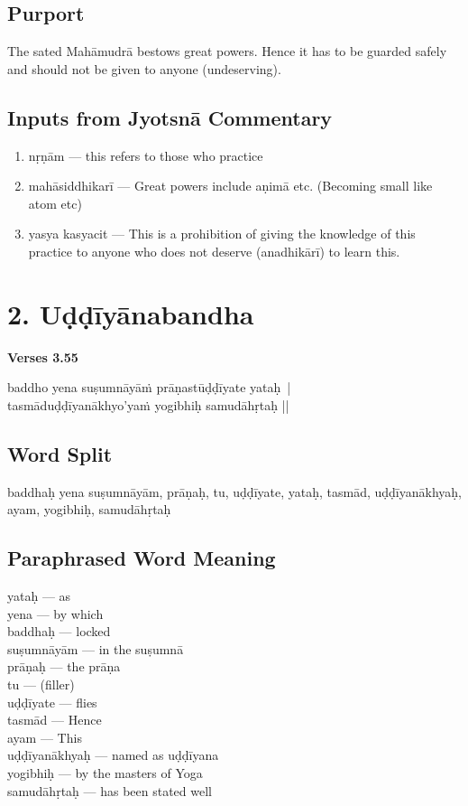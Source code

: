 \subsection*{Purport}

The sated Mahāmudrā bestows great powers. Hence it has to be guarded safely and should not be given to anyone (undeserving).

\subsection*{Inputs from Jyotsnā Commentary}

\begin{enumerate}
\item nṛṇām --- this refers to those who practice 
\item mahāsiddhikarī --- Great powers include aṇimā etc. (Becoming small like atom etc)
\item yasya kasyacit --- This is a prohibition of giving the knowledge of this practice to anyone who does not deserve  (anadhikārī) to learn this. 
\end{enumerate}
\newpage

\section*{2. Uḍḍīyānabandha}

\noindent \textbf{Verses 3.55}

\begin{shloka}
baddho yena suṣumnāyāṁ prāṇastūḍḍīyate yataḥ |\\
tasmāduḍḍīyanākhyo'yaṁ yogibhiḥ samudāhṛtaḥ ||
\end{shloka}

\subsection*{Word Split}

baddhaḥ yena suṣumnāyām,  prāṇaḥ, tu, uḍḍīyate, yataḥ, tasmād, uḍḍīyanākhyaḥ, ayam, yogibhiḥ, samudāhṛtaḥ 

\subsection*{Paraphrased Word Meaning}

\begin{multicols}{2}
yataḥ --- as \\
yena --- by which \\
baddhaḥ --- locked\\
suṣumnāyām --- in the suṣumnā\\
prāṇaḥ --- the prāṇa\\
tu --- (filler)\\
uḍḍīyate --- flies  \\
tasmād --- Hence \\
ayam --- This \\
uḍḍīyanākhyaḥ --- named as uḍḍīyana\\
yogibhiḥ ---  by the masters of Yoga\\
samudāhṛtaḥ --- has been stated well
\end{multicols}

